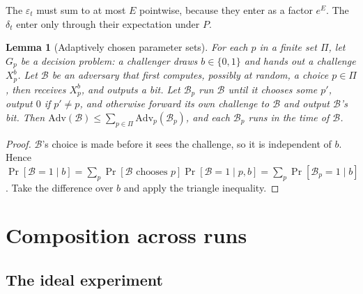 \documentclass[11pt]{article}
\theoremstyle{definition}
\theoremstyle{plain}
\newtheorem{lemma}[definition]{Lemma}
\newcommand{\Adv}{\mathrm{Adv}}
\begin{document}
The $\varepsilon_t$ must sum to at most $E$ pointwise, because they enter as a factor $e^E$. The $\delta_t$ enter only through their expectation under $P$.

\begin{lemma}[Adaptively chosen parameter sets]\label{lem:adaptpar}
For each $p$ in a finite set $\Pi$, let $G_p$ be a decision problem: a challenger draws $b\in\{0,1\}$ and hands out a challenge $X^b_p$. Let $\mathcal B$ be an adversary that first computes, possibly at random, a choice $p\in\Pi$, then receives $X_p^b$, and outputs a bit. Let $\mathcal B_p$ run $\mathcal B$ until it chooses some $p'$, output $0$ if $p'\ne p$, and otherwise forward its own challenge to $\mathcal B$ and output $\mathcal B$'s bit. Then $\Adv(\mathcal B)\le\sum_{p\in\Pi}\Adv_p(\mathcal B_p)$, and each $\mathcal B_p$ runs in the time of $\mathcal B$.
\end{lemma}
\begin{proof}
$\mathcal B$'s choice is made before it sees the challenge, so it is independent of $b$. Hence $\Pr[\mathcal B=1\mid b]=\sum_p\Pr[\mathcal B\text{ chooses }p]\Pr[\mathcal B=1\mid p,b]=\sum_p\Pr[\mathcal B_p=1\mid b]$. Take the difference over $b$ and apply the triangle inequality.
\end{proof}

\section{Composition across runs}
\label{sec:main}

\subsection{The ideal experiment}
\end{document}
